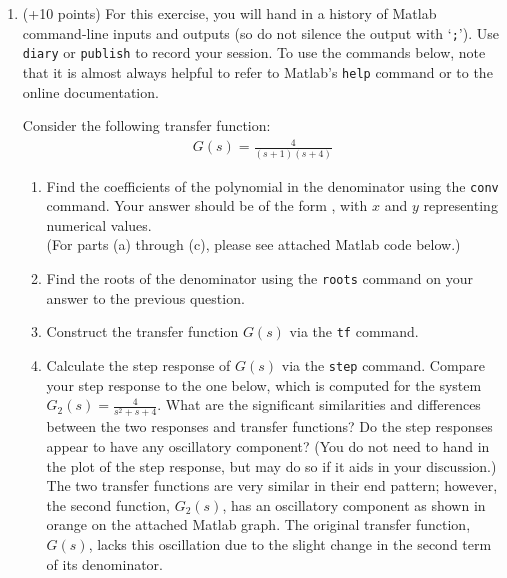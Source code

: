 \documentclass[11pt]{article}
\begin{document}
\begin{enumerate}
\begin{enumerate}
    \end{enumerate}
\item (+10 points) For this exercise, you will hand in a history of Matlab command-line inputs and outputs (so do not silence the output with ‘\texttt{;}’).  Use \texttt{diary} or \texttt{publish} to record your session. To use the commands below, note that it is almost always helpful to refer to Matlab’s \texttt{help} command or to the online documentation.\par
Consider the following transfer function:
    \begin{align}
        G(s)=\frac{4}{(s+1)(s+4)}
    \end{align}
    \begin{enumerate}
        \item Find the coefficients of the polynomial in the denominator using the \texttt{conv} command. Your answer should be of the form \text{[1 x y]}, with \(x\) and \(y\) representing numerical values.\\[1em]
        (For parts (a) through (c), please see attached Matlab code below.)
        \item Find the roots of the denominator using the \texttt{roots} command on your answer to the previous question.
        \item Construct the transfer function \(G(s)\) via the \texttt{tf} command.
        \item Calculate the step response of \(G(s)\) via the \texttt{step} command. Compare your step response to the  one  below,  which  is  computed  for  the  system \(G_2(s)=\frac{4}{s^2+s+4}\). What are the significant similarities and differences between the two responses and transfer functions? Do the step responses appear to have any oscillatory component? (You do not need to hand in the plot of the step response, but may do so if it aids in your discussion.)\\[1em]
        The two transfer functions are very similar in their end pattern; however, the second function, \(G_2(s)\), has an oscillatory component as shown in orange on the attached Matlab graph. The original transfer function, \(G(s)\), lacks this oscillation due to the slight change in the second term of its denominator.
    \end{enumerate}
\end{enumerate}

\end{document}
